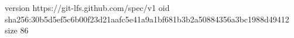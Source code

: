 version https://git-lfs.github.com/spec/v1
oid sha256:30b5d5ef5c6b00f23d21aafc5e41a9a1bf681b3b2a50884356a3bc1988d49412
size 86
